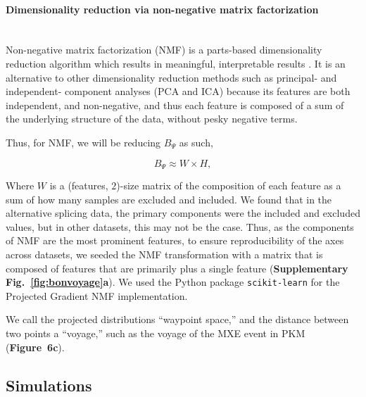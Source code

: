 \paragraph{Dimensionality reduction via non-negative matrix factorization}
\\
Non-negative matrix factorization (NMF) is a parts-based dimensionality reduction algorithm which results in meaningful, interpretable results \cite{Lee:1999gw}. It is an alternative to other dimensionality reduction methods such as principal- and independent- component analyses (PCA and ICA) because its features are both independent, and non-negative, and thus each feature is composed of a sum of the underlying structure of the data, without pesky negative terms.

Thus, for NMF, we will be reducing $B_\Psi$ as such,

\begin{equation}
B_\Psi \approx W \times H,
\end{equation}

Where $W$ is a (features, $2$)-size matrix of the composition of each feature as a sum of how many samples are excluded and included. We found that in the alternative splicing data, the primary components were the included and excluded values, but in other datasets, this may not be the case. Thus, as the components of NMF are the most prominent features, to ensure reproducibility of the axes across datasets, we seeded the NMF transformation with a matrix that is composed of features that are primarily \0 plus a single \1 feature (\textbf{Supplementary Fig.~\ref{fig:bonvoyage}a}). We used the Python package \texttt{scikit-learn} \cite{Pedregosa:2011tv} for the Projected Gradient NMF implementation.

We call the projected distributions ``waypoint space,'' and the distance between two points a ``voyage,'' such as the voyage of the MXE event in PKM (\textbf{Figure~6c}).


\subsection{Simulations}
\label{subsubsec:bonvoyage_simulations}

